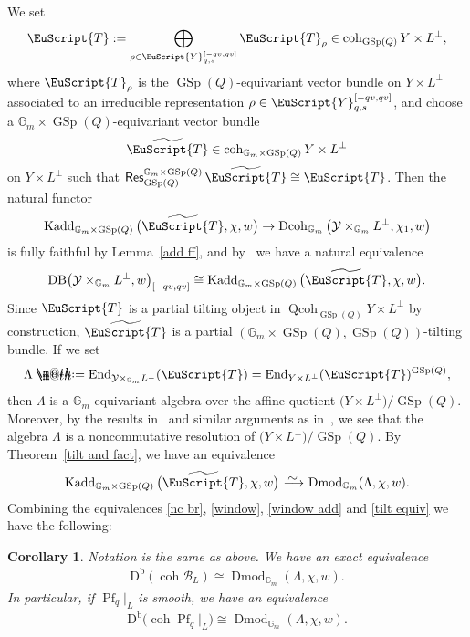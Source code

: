 \documentclass[10pt,a4paper]{amsart}
\makeatletter
\newtheorem{cor}[dfn]{Corollary}
\newcommand*{\defeq}{\mathrel{\rlap{%
 \raisebox{0.3ex}{$\m@th\cdot$}}%
 \raisebox{-0.3ex}{$\m@th\cdot$}}%
 =}
\numberwithin{equation}{section}
\newcommand{\Kadd}{\operatorname{Kadd}}
\newcommand{\Dmod}{\operatorname{Dmod}}
\newcommand{\Dcoh}{\operatorname{Dcoh}}
\newcommand{\End}{\operatorname{End}}
\newcommand{\coh}{\operatorname{coh}}
\newcommand{\Qcoh}{\operatorname{Qcoh}}
\newcommand{\Db}{\operatorname{D^b}}
\newcommand{\Pf}{\operatorname{Pf}}
\newcommand{\GSp}{\operatorname{GSp}}
\newcommand{\Res}{\operatorname{\sf Res}}
\newcommand{\cB}{\mathcal{B}}
\newcommand{\cY}{\mathcal{Y}}
\newcommand{\bG}{\mathbb{G}}
\newcommand{\scrT}{\EuScript{T}}
\newcommand{\scrY}{\EuScript{Y}}
\newcommand{\simto}{\,\,\,\,\raisebox{4pt}{$\sim$}{\kern -1.1em \longrightarrow}\,}
\newcommand{\rest}{\!|_L}
\makeatother
\begin{document}
We set
\begin{gather*}
\scrT:=\bigoplus_{\rho \in \scrY^{[-qv,qv]}_{q,s}} \scrT_{\rho}\in \coh_{\GSp(Q)}Y\times L^{\perp},
\end{gather*}
where $\scrT_{\rho}$ is the $\GSp(Q)$-equivariant vector bundle on $Y\times L^{\perp}$ associated to an irreducible representation $\rho\in\scrY^{[-qv,qv]}_{q,s}$, and choose a $\bG_m\times \GSp(Q)$-equivariant vector bundle
\begin{gather*}
\widetilde{\scrT}\in \coh_{\bG_m\times \GSp(Q)}Y\times L^{\perp}
\end{gather*}
on $Y\times L^{\perp}$ such that $\Res^{\bG_m\times \GSp(Q)}_{\GSp(Q)}\widetilde{\scrT}\cong \scrT$. Then the natural functor
\begin{gather*}
\Kadd_{\bG_m\times \GSp(Q)}\big(\widetilde{\scrT},\chi,w\big)\to \Dcoh_{\bG_m}\big(\cY\times_{\bG_m}L^{\perp},\chi_1,w\big)
\end{gather*}
is fully faithful by Lemma~\ref{add ff}, and by~\cite[Lemma~2.8]{rs} we have a natural equivalence
\begin{equation}\label{window add}
 {\rm DB}\big(\cY\times_{\bG_m}L^{\perp},w\big)_{[-qv,qv]}\cong \Kadd_{\bG_m\times \GSp(Q)}\big(\widetilde{\scrT},\chi,w\big).
\end{equation}
Since $\scrT$ is a partial tilting object in $\Qcoh _{\GSp(Q)}Y\times L^{\perp}$ by construction, $\widetilde{\scrT}$ is a partial $(\bG_m\times \GSp(Q),\GSp(Q))$-tilting bundle. If we set
\begin{gather*}
\Lambda\defeq\End_{\cY\times_{\bG_m}L^{\perp}}(\scrT)=\End_{Y\times L^{\perp}}(\scrT)^{\GSp(Q)},
\end{gather*}
then $\Lambda$ is a $\bG_m$-equivariant algebra over the affine quotient $\big(Y\times L^{\perp}\big)/\GSp(Q)$. Moreover, by the results in~\cite[Section~1.5]{svdb} and similar arguments as in~\cite[Section~5]{svdb}, we see that the algebra $\Lambda$ is a noncommutative resolution of $\big(Y\times L^{\perp}\big)/\GSp(Q)$.
By Theorem~\ref{tilt and fact}, we have an equivalence
\begin{gather}\label{tilt equiv}
\Kadd_{\bG_m\times \GSp(Q)}\big(\widetilde{\scrT},\chi,w\big)\simto\Dmod_{\bG_m}(\Lambda, \chi,w).
\end{gather}
Combining the equivalences \eqref{nc br}, \eqref{window}, \eqref{window add} and \eqref{tilt equiv} we have the following:

\begin{cor}\label{main cor}
Notation is the same as above. We have an exact equivalence
\begin{gather*}
\Db(\coh \cB_L)\cong \Dmod_{\bG_m}(\Lambda, \chi,w).
\end{gather*}
In particular, if $\Pf_q\rest$ is smooth, we have an equivalence
\begin{gather*}
\Db\big(\coh \Pf_q\rest\big)\cong \Dmod_{\bG_m}(\Lambda, \chi,w).
\end{gather*}
\end{cor}
\end{document}
